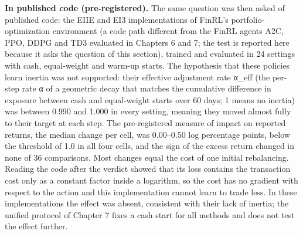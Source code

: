 \documentclass[12pt,a4paper]{report}
\newcounter{none} %
\begin{document}
\textbf{In published code (pre-registered).} The same question was then
asked of published code: the EIIE and EI3 implementations of FinRL's
portfolio-optimization environment (a code path different from the FinRL
agents A2C, PPO, DDPG and TD3 evaluated in Chapters 6 and 7; the test is
reported here because it asks the question of this section), trained and
evaluated in 24 settings with cash, equal-weight and warm-up starts. The
hypothesis that these policies learn inertia was not supported: their
effective adjustment rate α\_eff (the per-step rate α of a geometric
decay that matches the cumulative difference in exposure between cash
and equal-weight starts over 60 days; 1 means no inertia) was between
0.990 and 1.000 in every setting, meaning they moved almost fully to
their target at each step. The pre-registered measure of impact on
reported returns, the median change per cell, was 0.00--0.50 log
percentage points, below the threshold of 1.0 in all four cells, and the
sign of the excess return changed in none of 36 comparisons. Most
changes equal the cost of one initial rebalancing. Reading the code
after the verdict showed that its loss contains the transaction cost
only as a constant factor inside a logarithm, so the cost has no
gradient with respect to the action and this implementation cannot learn
to trade less. In these implementations the effect was absent,
consistent with their lack of inertia; the unified protocol of Chapter 7
fixes a cash start for all methods and does not test the effect further.
\end{document}
